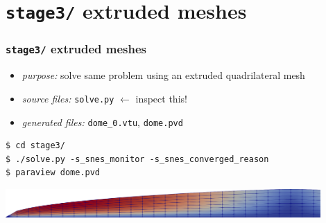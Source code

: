 \documentclass[10pt,hyperref,dvipsnames]{beamer}
\begin{document}
\section{\texttt{stage3/} \qquad extruded meshes}

\begin{frame}[fragile]
\frametitle{\texttt{stage3/} \qquad extruded meshes}

\begin{itemize}
\item \emph{purpose:} solve same problem using an extruded quadrilateral mesh
\item \emph{source files:} \texttt{solve.py} \hfill \alert{$\gets$ inspect this!}
\item \emph{generated files:} \texttt{dome\_0.vtu}, \texttt{dome.pvd}
\end{itemize}

\bigskip
\begin{Verbatim}
$ cd stage3/
$ ./solve.py -s_snes_monitor -s_snes_converged_reason
$ paraview dome.pvd
\end{Verbatim}

\vspace{10mm}
\begin{center}
\includegraphics[width=0.9\textwidth]{figs/stage3.png}
\end{center}
\end{frame}
\end{document}
